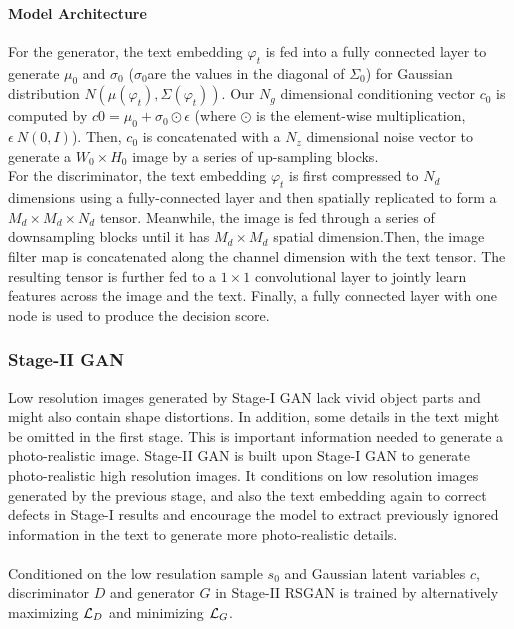 \documentclass{article}
\begin{document}
\paragraph{Model Architecture}
For the generator, the text embedding $\varphi_t$ is fed into a fully connected layer to generate $\mu_0$ and $\sigma_0$ ($\sigma_0$are the values in the diagonal of $\Sigma_0$) for Gaussian distribution $N(\mu(\varphi_t), \Sigma(\varphi_t))$. 
Our $N_g$ dimensional conditioning vector $c_0$ is computed by $c0= \mu_0 + \sigma_0 \odot \epsilon$ (where $\odot$ is the element-wise multiplication, $\epsilon ~ N(0,I)$). Then, $c_0$ is concatenated with a $N_z$ dimensional noise vector to generate a $W_0 \times H_0$ image by a series of up-sampling blocks.
\\
For the discriminator, the text embedding $\varphi_t$ is first compressed to $N_d$ dimensions using a fully-connected layer and then spatially replicated to form a $M_d \times M_d \times N_d$ tensor. Meanwhile, the image is fed through a series of downsampling blocks until it has $M_d \times M_d$ spatial dimension.Then, the image filter map is concatenated along the channel dimension with the text tensor. The resulting tensor is further fed to a $1\times 1$ convolutional layer to jointly learn features across the image and the text. Finally, a fully connected layer with one node is used to produce the decision score.

\subsubsection{Stage-II GAN}
Low resolution images generated by Stage-I GAN lack vivid object parts and might also contain shape distortions. In addition, some details in the text might be omitted in the first stage. This is important information needed to generate a photo-realistic image. Stage-II GAN is built upon Stage-I GAN to generate photo-realistic high resolution images. It conditions on low resolution images generated by the previous stage, and also the text embedding again to correct defects in Stage-I results and encourage the model to extract previously ignored information in the text to generate more photo-realistic details.
\\\\
Conditioned on the low resulation sample $s_0$ and Gaussian latent variables $c$, discriminator $D$ and generator $G$ in {Stage-II RSGAN} is trained  by alternatively maximizing $\mathcal{L_\mathnormal{D}}$ and minimizing $\mathcal{L_\mathnormal{G}}$.
\end{document}
